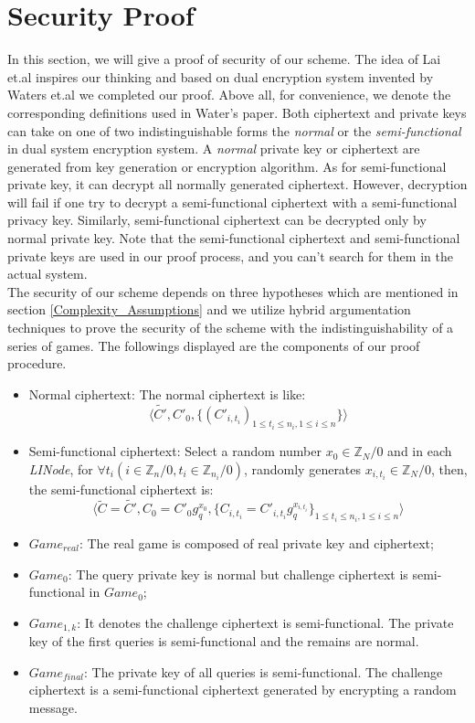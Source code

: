 \documentclass[smallextended]{svjour3}       %
\begin{document}
\section{Security Proof}\label{section4}
In this section, we will give a proof of security of our scheme. The idea of Lai et.al inspires our thinking and based on dual encryption system invented by Waters et.al we completed our proof. Above all, for convenience, we denote the corresponding definitions used in Water's paper. Both ciphertext and private keys can take on one of two indistinguishable forms the \textit{normal} or the \textit{semi-functional} in dual system encryption system. A \textit{normal} private key or ciphertext are generated from key generation or encryption algorithm. As for semi-functional private key, it can decrypt all normally generated ciphertext. However, decryption will fail if one try to decrypt a semi-functional ciphertext with a semi-functional privacy key. Similarly, semi-functional ciphertext can be decrypted only by normal private key. Note that the semi-functional ciphertext and semi-functional private keys are used in our proof process, and you can't search for them in the actual system.\\
The security of our scheme depends on three hypotheses which are mentioned in section \ref{Complexity_Assumptions} and we utilize hybrid argumentation techniques to prove the security of the scheme with the indistinguishability of a series of games. The followings displayed are the components of our proof procedure.
\begin{itemize}
	\item Normal ciphertext: The normal ciphertext is like: 
	\begin{equation}
		\langle \tilde{C'},C'_0,\{(C'_{i,t_i})_{1 \leq t_i \leq n_i, 1 \leq i \leq n}\}  \rangle
	\end{equation}
	\item Semi-functional ciphertext: Select a random number $x_0 \in \mathbb{Z}_N/0$ and in each \textit{LINode}, for $\forall t_i(i \in \mathbb{Z}_n/0,t_i \in \mathbb{Z}_{n_i}/0)$, randomly generates $x_{i, t_i} \in \mathbb{Z}_N/0$, then, the semi-functional ciphertext is: 
	\begin{equation}
		\langle \tilde{C}=\tilde{C'},C_0=C'_0g_q^{x_0},\{C_{i,t_i}=C'_{i,t_i}g_q^{x_{i,t_i}}\}_{1 \leq t_i \leq n_i, 1 \leq i \leq n} \rangle
	\end{equation}	
\end{itemize}
\begin{itemize}
	\item $Game_{real}$: The real game is composed of real private key and ciphertext;
	\item $Game_0$: The query private key is normal but challenge ciphertext is semi-functional in $Game_0$;
	\item $Game_{1,k}$: It denotes the challenge ciphertext is semi-functional. The private key of the first queries is semi-functional and the remains are normal.
	\item $Game_{final}$: The private key of all queries is semi-functional. The challenge ciphertext is a semi-functional ciphertext generated by encrypting a random message.
\end{itemize}
\end{document}
